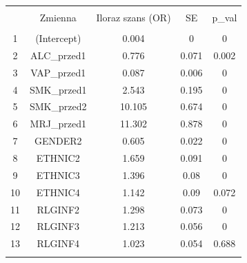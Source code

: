 
\begin{tabular}{@{\extracolsep{5pt}} ccccc} 
\\[-1.8ex]\hline 
\hline \\[-1.8ex] 
 & Zmienna & Iloraz szans (OR) & SE & p\_val \\ 
\hline \\[-1.8ex] 
1 & (Intercept) & 0.004 & 0 & 0 \\ 
2 & ALC\_przed1 & 0.776 & 0.071 & 0.002 \\ 
3 & VAP\_przed1 & 0.087 & 0.006 & 0 \\ 
4 & SMK\_przed1 & 2.543 & 0.195 & 0 \\ 
5 & SMK\_przed2 & 10.105 & 0.674 & 0 \\ 
6 & MRJ\_przed1 & 11.302 & 0.878 & 0 \\ 
7 & GENDER2 & 0.605 & 0.022 & 0 \\ 
8 & ETHNIC2 & 1.659 & 0.091 & 0 \\ 
9 & ETHNIC3 & 1.396 & 0.08 & 0 \\ 
10 & ETHNIC4 & 1.142 & 0.09 & 0.072 \\ 
11 & RLGINF2 & 1.298 & 0.073 & 0 \\ 
12 & RLGINF3 & 1.213 & 0.056 & 0 \\ 
13 & RLGINF4 & 1.023 & 0.054 & 0.688 \\ 
\hline \\[-1.8ex] 
\end{tabular} 
